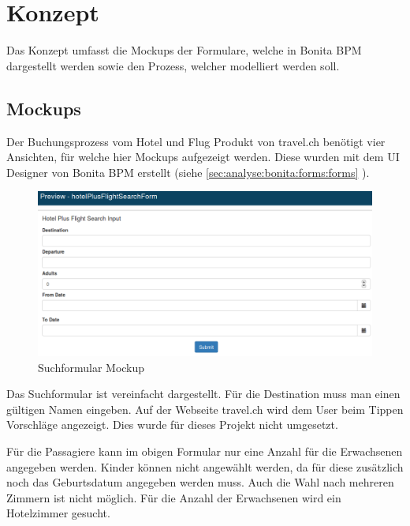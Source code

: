
\chapter{Konzept}
\label{sec:konzept}
Das Konzept umfasst die Mockups der Formulare, welche in Bonita BPM dargestellt werden sowie den Prozess, welcher modelliert werden soll.

\section{Mockups}
\label{sec:konzept:mockups}
Der Buchungsprozess vom Hotel und Flug Produkt von travel.ch benötigt vier Ansichten, für welche hier Mockups aufgezeigt werden.
Diese wurden mit dem UI Designer von Bonita BPM erstellt (siehe \cref{sec:analyse:bonita:forms:forms} ).

\begin{figure}[H]
	\centering
	\includegraphics[width=1\textwidth]{images/forms-search.png}
	\caption{Suchformular Mockup}
	\label{fig:konzept:mockups:search}
\end{figure}

Das Suchformular ist vereinfacht dargestellt. Für die Destination muss man einen gültigen Namen eingeben. Auf der Webseite travel.ch wird dem User beim Tippen Vorschläge angezeigt. Dies wurde für dieses Projekt nicht umgesetzt.

Für die Passagiere kann im obigen Formular nur eine Anzahl für die Erwachsenen angegeben werden. Kinder können nicht angewählt werden, da für diese zusätzlich noch das Geburtsdatum angegeben werden muss. Auch die Wahl nach mehreren Zimmern ist nicht möglich. Für die Anzahl der Erwachsenen wird ein Hotelzimmer gesucht.

